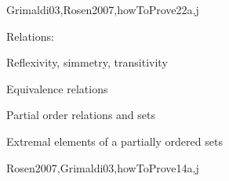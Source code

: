 \begin{syllabus}
\begin{unit}{\DSSetsRelationsandFunctions}{}{Grimaldi03,Rosen2007,howToProve}{22}{a,j}
\begin{topics}
    \item \DSSetsRelationsandFunctionsTopicSets
    \item Relations:
        \begin{subtopics}
            \item Reflexivity, simmetry, transitivity
            \item Equivalence relations
            \item Partial order relations and sets
            \item Extremal elements of a partially ordered sets
        \end{subtopics}
    \item \DSSetsRelationsandFunctionsTopicFunctions
\end{topics}
\begin{learningoutcomes}
    \item \DSSetsRelationsandFunctionsLOExplainWith [\Assessment]
    \item \DSSetsRelationsandFunctionsLOPerformThe [\Assessment]
    \item \DSSetsRelationsandFunctionsLORelate [\Assessment]
\end{learningoutcomes}
\end{unit}

\begin{unit}{\DSBasicLogic}{}{Rosen2007,Grimaldi03,howToProve}{14}{a,j}
\begin{topics}
    \item \DSBasicLogicTopicPropositional%
    \item \DSBasicLogicTopicLogical%
    \item \DSBasicLogicTopicTruth%
    \item \DSBasicLogicTopicNormal%
    \item \DSBasicLogicTopicValidity%
    \item \DSBasicLogicTopicPropositionalInference%
    \item \DSBasicLogicTopicPredicate%
    \item \DSBasicLogicTopicLimitations%
\end{topics}
\begin{learningoutcomes}
    \item \DSBasicLogicLOConvertLogical [\Usage ]
    \item \DSBasicLogicLOApplyFormal [\Usage ]
    \item \DSBasicLogicLOUseThe [\Usage]
    \item \DSBasicLogicLODescribeHowCan [\Familiarity]
    \item \DSBasicLogicLOApplyFormalAnd [\Usage ]
    \item \DSBasicLogicLODescribeTheLimitationsAnd [\Usage]
\end{learningoutcomes}
\end{unit}


\end{syllabus}
